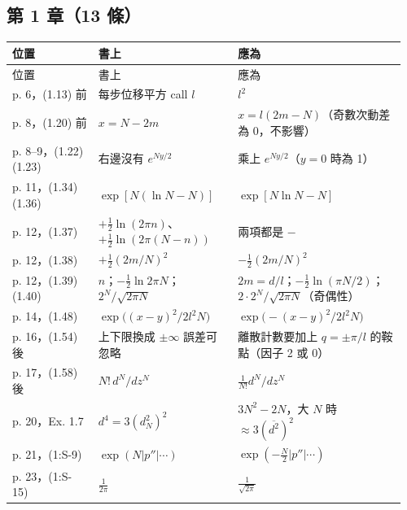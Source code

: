 \subsection{第 1 章（13 條）}
{\footnotesize\renewcommand{\arraystretch}{1.1}\setlength{\tabcolsep}{4pt}
\begin{longtable}{@{}>{\raggedright\arraybackslash}p{0.21\linewidth}>{\raggedright\arraybackslash}p{0.34\linewidth}>{\raggedright\arraybackslash}p{0.41\linewidth}@{}}
\toprule 位置 & 書上 & 應為\\ \midrule\endfirsthead
\toprule 位置 & 書上 & 應為\\ \midrule\endhead
\bottomrule\endfoot
p. 6，(1.13) 前 & 每步位移平方 call $l$ & $l^2$\\
p. 8，(1.20) 前 & $x=N-2m$ & $x=l(2m-N)$（奇數次動差為 0，不影響）\\
p. 8–9，(1.22)(1.23) & 右邊沒有 $e^{Ny/2}$ & 乘上 $e^{Ny/2}$（$y=0$ 時為 1）\\
p. 11，(1.34)(1.36) & $\exp[N(\ln N-N)]$ & $\exp[N\ln N-N]$\\
p. 12，(1.37) & $+\frac12\ln(2\pi n)$、$+\frac12\ln(2\pi(N-n))$ & 兩項都是 $-$\\
p. 12，(1.38) & $+\frac12(2m/N)^2$ & $-\frac12(2m/N)^2$\\
p. 12，(1.39)(1.40) & $n$；$-\frac12\ln2\pi N$；$2^N/\sqrt{2\pi N}$ & $2m=d/l$；$-\frac12\ln(\pi N/2)$；$2\cdot2^N/\sqrt{2\pi N}$（奇偶性）\\
p. 14，(1.48) & $\exp\big((x-y)^2/2l^2N\big)$ & $\exp\big(-(x-y)^2/2l^2N\big)$\\
p. 16，(1.54) 後 & 上下限換成 $\pm\infty$ 誤差可忽略 & 離散計數要加上 $q=\pm\pi/l$ 的鞍點（因子 2 或 0）\\
p. 17，(1.58) 後 & $N!\,d^N/dz^N$ & $\frac1{N!}d^N/dz^N$\\
p. 20，Ex. 1.7 & $d^4=3(d_N^2)^2$ & $3N^2-2N$，大 $N$ 時 $\approx3(\overline{d^2})^2$\\
p. 21，(1:S-9) & $\exp(N|p''|\cdots)$ & $\exp(-\frac N2|p''|\cdots)$\\
p. 23，(1:S-15) & $\frac1{2\pi}$ & $\frac1{\sqrt{2\pi}}$\\
\end{longtable}}

